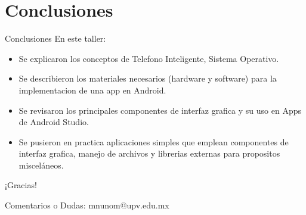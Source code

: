\documentclass[aspectratio=169,compress]{beamer}
\begin{document}
%















\section[CP1]{Conclusiones}
\begin{frame}{Conclusiones}
En este taller:
\begin{itemize}
\item Se explicaron los conceptos de Telefono Inteligente, Sistema Operativo.
\item Se describieron los materiales necesarios (hardware y software) para la implementacion de una app en Android.
\item Se revisaron los principales componentes de interfaz grafica y su uso en Apps de Android Studio. 
\item Se pusieron en practica aplicaciones simples que emplean componentes de interfaz grafica, manejo de archivos y librerias externas para propositos misceláneos. 

\end{itemize}
\end{frame}

\begin{frame}%
\begin{center}
{\fontsize{40}{50}\selectfont ¡Gracias!}
\end{center}
Comentarios o Dudas: mnunom@upv.edu.mx 
\end{frame}
\end{document}
